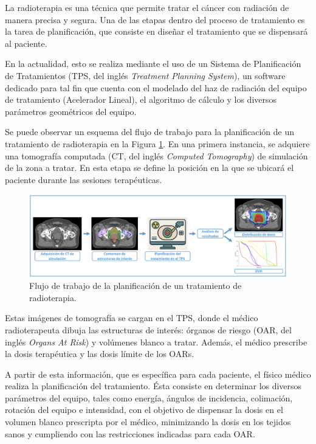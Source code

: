 \documentclass[
11pt, %
codirector, %
]{charter}
\begin{document}
La radioterapia es una técnica que permite tratar el cáncer con radiación de manera precisa y segura. Una de las etapas dentro del proceso de tratamiento es la tarea de planificación, que consiste en diseñar el tratamiento que se dispensará al paciente.

En la actualidad, esto se realiza mediante el uso de un Sistema de Planificación de Tratamientos (TPS, del inglés \textit{Treatment Planning System}), un software dedicado para tal fin que cuenta con el modelado del haz de radiación del equipo de tratamiento (Acelerador Lineal), el algoritmo de cálculo y los diversos parámetros geométricos del equipo. 

Se puede observar un esquema del flujo de trabajo para la planificación de un tratamiento de radioterapia en la Figura \ref{fig:FlujoTrabajo}. En una primera instancia, se adquiere una tomografía computada (CT, del inglés \textit{Computed Tomography}) de simulación de la zona a tratar. En esta etapa se define la posición en la que se ubicará el paciente durante las sesiones terapéuticas.

\vspace{10px}

\begin{figure}[H]
\centering 
\includegraphics[width=1\textwidth]{./Figuras/Fig1-FlujoDeTrabajo.png}
\caption{Flujo de trabajo de la planificación de un tratamiento de radioterapia.}
\label{fig:FlujoTrabajo}
\end{figure}

\vspace{15px}

Estas imágenes de tomografía se cargan en el TPS, donde el médico radioterapeuta dibuja las estructuras de interés: órganos de riesgo (OAR, del inglés \textit{Organs At Risk}) y volúmenes blanco a tratar. Además, el médico prescribe la dosis terapéutica y las dosis límite de los OARs. 

A partir de esta información, que es específica para cada paciente, el físico médico realiza la planificación del tratamiento. Ésta consiste en determinar los diversos parámetros del equipo, tales como energía, ángulos de incidencia, colimación, rotación del equipo e intensidad, con el objetivo de dispensar la dosis en el volumen blanco prescripta por el médico, minimizando la dosis en los tejidos sanos y cumpliendo con las restricciones indicadas para cada OAR.
\end{document}
